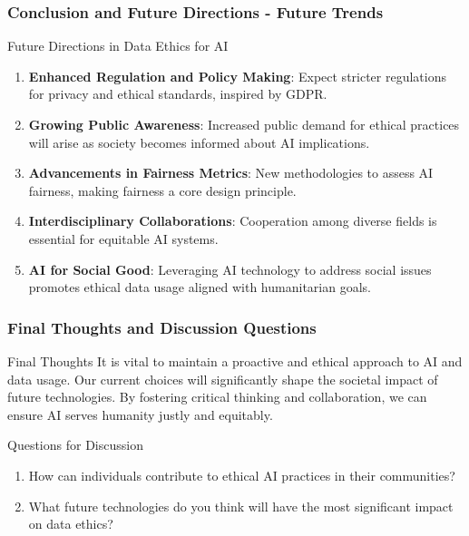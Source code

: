 \documentclass[aspectratio=169]{beamer}
\begin{document}
\begin{frame}[fragile]
    \frametitle{Conclusion and Future Directions - Future Trends}
    \begin{block}{Future Directions in Data Ethics for AI}
        \begin{enumerate}
            \item \textbf{Enhanced Regulation and Policy Making}:
                Expect stricter regulations for privacy and ethical standards, inspired by GDPR.
            
            \item \textbf{Growing Public Awareness}: 
                Increased public demand for ethical practices will arise as society becomes informed about AI implications.
                
            \item \textbf{Advancements in Fairness Metrics}:
                New methodologies to assess AI fairness, making fairness a core design principle.
                
            \item \textbf{Interdisciplinary Collaborations}:
                Cooperation among diverse fields is essential for equitable AI systems.
                
            \item \textbf{AI for Social Good}:
                Leveraging AI technology to address social issues promotes ethical data usage aligned with humanitarian goals.
        \end{enumerate}
    \end{block}
\end{frame}

\begin{frame}[fragile]
    \frametitle{Final Thoughts and Discussion Questions}
    \begin{block}{Final Thoughts}
        It is vital to maintain a proactive and ethical approach to AI and data usage. Our current choices will significantly shape the societal impact of future technologies. 
        By fostering critical thinking and collaboration, we can ensure AI serves humanity justly and equitably.
    \end{block}

    \begin{block}{Questions for Discussion}
        \begin{enumerate}
            \item How can individuals contribute to ethical AI practices in their communities?
            \item What future technologies do you think will have the most significant impact on data ethics?
        \end{enumerate}
    \end{block}
\end{frame}
\end{document}
